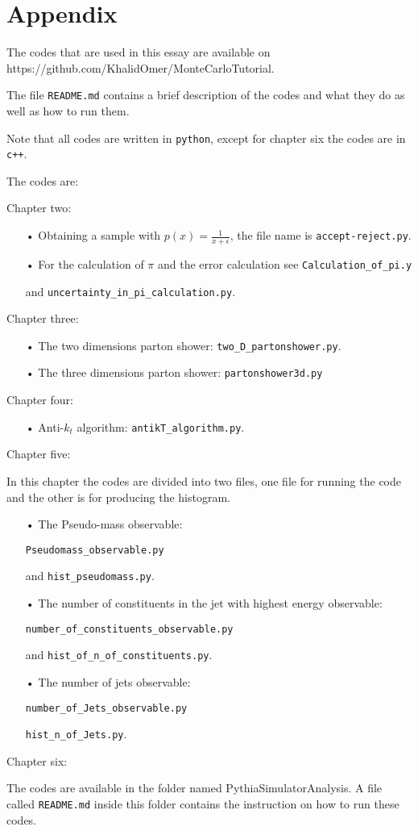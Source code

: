 \chapter*{Appendix}

The codes that are used in this essay are available on https://github.com/KhalidOmer/MonteCarloTutorial. 

The file \verb+README.md+ contains a brief description of the codes and what they do as well as how to run them.

Note that all codes are written in \verb+python+, except for chapter six the codes are in \verb!c++!.

The codes are:

Chapter two:
\begin{itemize}
\item[•] Obtaining a sample with $p(x) = \frac{1}{x+\epsilon}$, the file name is \verb+accept-reject.py+.
\item[•] For the calculation of $\pi$ and the error calculation see \verb+Calculation_of_pi.y+ 

and \verb+uncertainty_in_pi_calculation.py+.
\end{itemize}  
Chapter three:
\begin{itemize}
\item[•]The two dimensions parton shower: \verb+two_D_partonshower.py+. 
\item[•]The three dimensions parton shower: \verb+partonshower3d.py+ 
\end{itemize}
Chapter four:
\begin{itemize}
\item[•] Anti-$k_t$ algorithm: \verb+antikT_algorithm.py+.
\end{itemize}
Chapter five:

In this chapter the codes are divided into two files,  one file for running the code and the other is for producing the histogram.   
\begin{itemize}
\item[•] The Pseudo-mass observable:

\verb+Pseudomass_observable.py+ 

and \verb+hist_pseudomass.py+.
\item[•] The number of constituents in the jet with highest energy observable: 

\verb+number_of_constituents_observable.py+ 

and \verb+hist_of_n_of_constituents.py+.
\item[•] The number of jets observable:

\verb+number_of_Jets_observable.py+

\verb+hist_n_of_Jets.py+.
\end{itemize}
Chapter six:

The codes are available in the folder named PythiaSimulatorAnalysis. A file called \verb+README.md+ inside this folder contains the instruction on how to run these codes.  